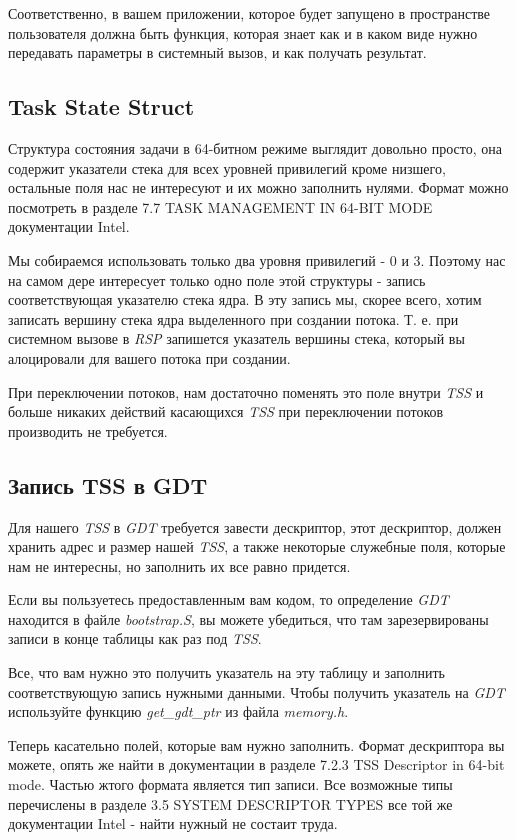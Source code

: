 Соответственно, в вашем приложении, которое будет запущено в пространстве пользователя
должна быть функция, которая знает как и в каком виде нужно передавать параметры
в системный вызов, и как получать результат.

\subsection{Task State Struct}

Структура состояния задачи в 64-битном режиме выглядит довольно просто, она содержит
указатели стека для всех уровней привилегий кроме низшего, остальные поля нас не
интересуют и их можно заполнить нулями. Формат можно посмотреть в разделе
7.7 TASK MANAGEMENT IN 64-BIT MODE документации Intel.

Мы собираемся использовать только два уровня привилегий - 0 и 3. Поэтому нас на
самом дере интересует только одно поле этой структуры - запись соответствующая
указателю стека ядра. В эту запись мы, скорее всего, хотим записать вершину
стека ядра выделенного при создании потока. Т. е. при системном вызове в \emph{RSP}
запишется указатель вершины стека, который вы алоцировали для вашего потока при
создании.

При переключении потоков, нам достаточно поменять это поле внутри \emph{TSS} и
больше никаких действий касающихся \emph{TSS} при переключении потоков производить
не требуется.

\subsection{Запись TSS в GDT}

Для нашего \emph{TSS} в \emph{GDT} требуется завести дескриптор, этот дескриптор,
должен хранить адрес и размер нашей \emph{TSS}, а также некоторые служебные поля,
которые нам не интересны, но заполнить их все равно придется.

Если вы пользуетесь предоставленным вам кодом, то определение \emph{GDT} находится
в файле \emph{bootstrap.S}, вы можете убедиться, что там зарезервированы записи в
конце таблицы как раз под \emph{TSS}.

Все, что вам нужно это получить указатель на эту таблицу и заполнить соответствующую
запись нужными данными. Чтобы получить указатель на \emph{GDT} используйте функцию
\emph{get\_gdt\_ptr} из файла \emph{memory.h}.

Теперь касательно полей, которые вам нужно заполнить. Формат дескриптора вы можете,
опять же найти в документации в разделе 7.2.3 TSS Descriptor in 64-bit mode. Частью
жтого формата является тип записи. Все возможные типы перечислены в разделе 3.5
SYSTEM DESCRIPTOR TYPES все той же документации Intel - найти нужный не состаит
труда.

